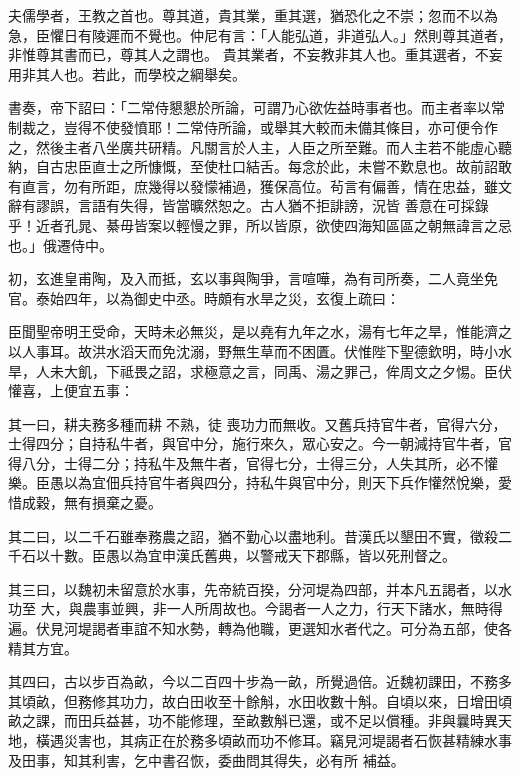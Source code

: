 \begin{pinyinscope}
 夫儒學者，王教之首也。尊其道，貴其業，重其選，猶恐化之不崇；忽而不以為急，臣懼日有陵遲而不覺也。仲尼有言：「人能弘道，非道弘人。」然則尊其道者，非惟尊其書而已，尊其人之謂也。
 貴其業者，不妄教非其人也。重其選者，不妄用非其人也。若此，而學校之綱舉矣。



 書奏，帝下詔曰：「二常侍懇懇於所論，可謂乃心欲佐益時事者也。而主者率以常制裁之，豈得不使發憤耶！二常侍所論，或舉其大較而未備其條目，亦可便令作之，然後主者八坐廣共研精。凡關言於人主，人臣之所至難。而人主若不能虛心聽納，自古忠臣直士之所慷慨，至使杜口結舌。每念於此，未嘗不歎息也。故前詔敢有直言，勿有所距，庶幾得以發懞補過，獲保高位。茍言有偏善，情在忠益，雖文辭有謬誤，言語有失得，皆當曠然恕之。古人猶不拒誹謗，況皆
 善意在可採錄乎！近者孔晁、綦毋皆案以輕慢之罪，所以皆原，欲使四海知區區之朝無諱言之忌也。」俄遷侍中。



 初，玄進皇甫陶，及入而抵，玄以事與陶爭，言喧嘩，為有司所奏，二人竟坐免官。泰始四年，以為御史中丞。時頗有水旱之災，玄復上疏曰：



 臣聞聖帝明王受命，天時未必無災，是以堯有九年之水，湯有七年之旱，惟能濟之以人事耳。故洪水滔天而免沈溺，野無生草而不困匱。伏惟陛下聖德欽明，時小水旱，人未大飢，下祗畏之詔，求極意之言，同禹、湯之罪己，侔周文之夕惕。臣伏懽喜，上便宜五事：



 其一曰，耕夫務多種而耕不熟，徒
 喪功力而無收。又舊兵持官牛者，官得六分，士得四分；自持私牛者，與官中分，施行來久，眾心安之。今一朝減持官牛者，官得八分，士得二分；持私牛及無牛者，官得七分，士得三分，人失其所，必不懽樂。臣愚以為宜佃兵持官牛者與四分，持私牛與官中分，則天下兵作懽然悅樂，愛惜成穀，無有損棄之憂。



 其二曰，以二千石雖奉務農之詔，猶不勤心以盡地利。昔漢氏以墾田不實，徵殺二千石以十數。臣愚以為宜申漢氏舊典，以警戒天下郡縣，皆以死刑督之。



 其三曰，以魏初未留意於水事，先帝統百揆，分河堤為四部，并本凡五謁者，以水功至
 大，與農事並興，非一人所周故也。今謁者一人之力，行天下諸水，無時得遍。伏見河堤謁者車誼不知水勢，轉為他職，更選知水者代之。可分為五部，使各精其方宜。



 其四曰，古以步百為畝，今以二百四十步為一畝，所覺過倍。近魏初課田，不務多其頃畝，但務修其功力，故白田收至十餘斛，水田收數十斛。自頃以來，日增田頃畝之課，而田兵益甚，功不能修理，至畝數斛已還，或不足以償種。非與曩時異天地，橫遇災害也，其病正在於務多頃畝而功不修耳。竊見河堤謁者石恢甚精練水事及田事，知其利害，乞中書召恢，委曲問其得失，必有所
 補益。




\end{pinyinscope}
